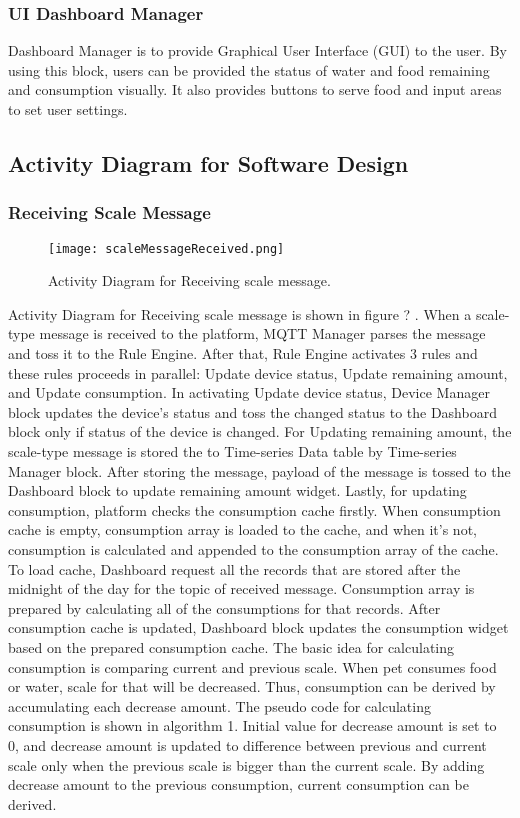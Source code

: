 \documentclass[conference]{IEEEtran}
\begin{document}
\subsubsection{UI Dashboard Manager}
\hfill \break Dashboard Manager is to provide Graphical User Interface (GUI) to the user. By using this block, users can be provided the status of water and food remaining and consumption visually. It also provides buttons to serve food and input areas to set user settings.

\subsection{Activity Diagram for Software Design}
\subsubsection{Receiving Scale Message}
\begin{figure}[htbp]
\centerline{\texttt{[image: scaleMessageReceived.png]}}
\caption{Activity Diagram for Receiving scale message.}
\label{fig}
\end{figure}

Activity Diagram for Receiving scale message is shown in figure ?
. When a scale-type message is received to the platform, MQTT Manager parses the message and toss it to the Rule Engine. After that, Rule Engine activates 3 rules and these rules proceeds in parallel: Update device status, Update remaining amount, and Update consumption. In activating Update device status, Device Manager block updates the device’s status and toss the changed status to the Dashboard block only if status of the device is changed. For Updating remaining amount, the scale-type message is stored the to Time-series Data table by Time-series Manager block. After storing the message, payload of the message is tossed to the Dashboard block to update remaining amount widget.
Lastly, for updating consumption, platform checks the consumption cache firstly. When consumption cache is empty, consumption array is loaded to the cache, and when it’s not, consumption is calculated and appended to the consumption array of the cache. To load cache, Dashboard request all the records that are stored after the midnight of the day for the topic of received message. Consumption array is prepared by calculating all of the consumptions for that records. After consumption cache is updated, Dashboard block updates the consumption widget based on the prepared consumption cache.
The basic idea for calculating consumption is comparing current and previous scale. When pet consumes food or water, scale for that will be decreased. Thus, consumption can be derived by accumulating each decrease amount. The pseudo code for calculating consumption is shown in algorithm 1. Initial value for decrease amount is set to 0, and decrease amount is updated to difference between previous and current scale only when the previous scale is bigger than the current scale. By adding decrease amount to the previous consumption, current consumption can be derived.
\end{document}
